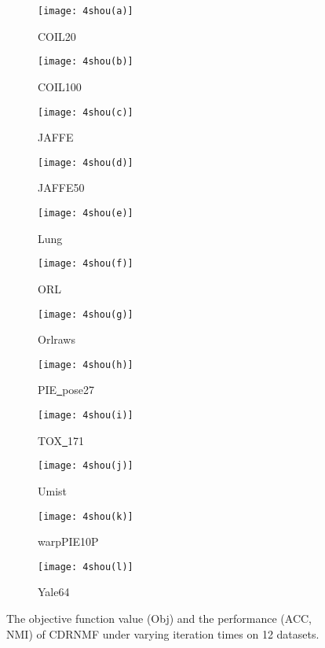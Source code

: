 \documentclass[a4paper,fleqn]{cas-sc}
\begin{document}
\begin{figure}[h]
	\centering
	\begin{subfigure}[b]{.23\textwidth}
		\centering
		\texttt{[image: 4shou(a)]}
		\caption{COIL20}\label{subfig:4shou(a)}
	\end{subfigure}
	\begin{subfigure}[b]{.23\textwidth}
		\centering
		\texttt{[image: 4shou(b)]}
		\caption{COIL100}\label{subfig:4shou(b)}
	\end{subfigure}
	\begin{subfigure}[b]{.23\textwidth}
		\centering
		\texttt{[image: 4shou(c)]}
		\caption{JAFFE}\label{subfig:4shou(c)}
	\end{subfigure}
	\begin{subfigure}[b]{.23\textwidth}
		\centering
		\texttt{[image: 4shou(d)]}
		\caption{JAFFE50}\label{subfig:4shou(d)}
	\end{subfigure}
	
	\quad
	
	\begin{subfigure}[b]{.23\textwidth}
		\centering
		\texttt{[image: 4shou(e)]}
		\caption{Lung}\label{subfig:4shou(e)}
	\end{subfigure}
	\begin{subfigure}[b]{.23\textwidth}
		\centering
		\texttt{[image: 4shou(f)]}
		\caption{ORL}\label{subfig:4shou(f)}
	\end{subfigure}
	\begin{subfigure}[b]{.23\textwidth}
		\centering
		\texttt{[image: 4shou(g)]}
		\caption{Orlraws}\label{subfig:4shou(g)}
	\end{subfigure}
	\begin{subfigure}[b]{.23\textwidth}
		\centering
		\texttt{[image: 4shou(h)]}
		\caption{PIE\underline{~}pose27}\label{subfig:4shou(h)}
	\end{subfigure}
	
	\quad
	
	\begin{subfigure}[b]{.23\textwidth}
		\centering
		\texttt{[image: 4shou(i)]}
		\caption{TOX\underline{~}171}\label{subfig:4shou(i)}
	\end{subfigure}
	\begin{subfigure}[b]{.23\textwidth}
		\centering
		\texttt{[image: 4shou(j)]}
		\caption{Umist}\label{subfig:4shou(j)}
	\end{subfigure}
	\begin{subfigure}[b]{.23\textwidth}
		\centering
		\texttt{[image: 4shou(k)]}
		\caption{warpPIE10P}\label{subfig:4shou(k)}
	\end{subfigure}
	\begin{subfigure}[b]{.23\textwidth}
		\centering
		\texttt{[image: 4shou(l)]}
		\caption{Yale64}\label{subfig:4shou(l)}
	\end{subfigure}
	\caption{The objective function value (Obj) and the performance (ACC, NMI) of CDRNMF under varying iteration times on 12 datasets.}\label{fig:4shou}
\end{figure}
\end{document}
